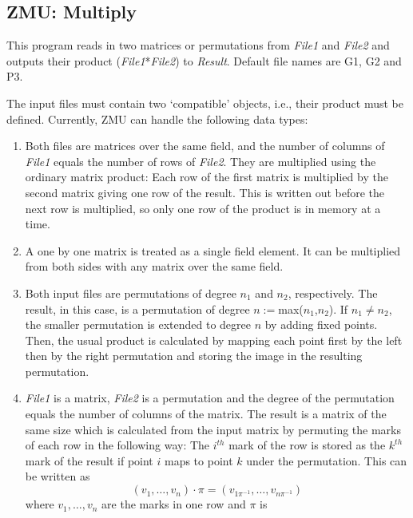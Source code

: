 \subsection{ZMU: Multiply}\label{sec:zmu}
\Syntax
{}

\Description
This program reads in two matrices or permutations from {\it File1} and
{\it File2} and outputs their product ({\it File1}*{\it File2}) to 
{\it Result}. Default file names are G1,  G2 and P3.

The input files must contain two `compatible' objects, i.e., their
product must be defined. Currently,  ZMU can handle the following
data types:
\begin{enumerate}
\item	Both files are matrices over the same field, and the
	number of columns of {\it File1} equals the number of rows of
        {\it File2}.
     	They are multiplied using the ordinary matrix product: Each
	row of the first matrix is multiplied by the second matrix
	giving one row of the result. This is written out before the
        next row is multiplied, so only one row of the product is in
        memory at a time.
\item	A one by one matrix is treated as a single field
	element. It can be multiplied from both sides with any
	matrix over the same field.
\item	Both input files are permutations of degree $n_1$ and $n_2$,
	respectively. The result, in this case, is a permutation of
	degree $n:=$max($n_1$,$n_2$). If $n_1\neq n_2$, the smaller
	permutation is extended to degree $n$ by adding fixed points.
	Then, the usual product is
	calculated by mapping each point first by the left then by
	the right permutation and storing the image in the resulting
	permutation.
\item	{\it File1} is a matrix, {\it File2} is a permutation and the
        degree of the permutation equals the number of columns of the
        matrix.
	The result is a matrix of the same size which is calculated
	from the input matrix by permuting the marks of each row in
	the following way: The $i^{th}$ mark of the row is stored as
	the $k^{th}$ mark of the result if point $i$ maps to point $k$
	under the permutation. This can be written as
	\[
		(v_1,\ldots,v_n)\cdot\pi =
		(v_{1\pi^{-1}},\ldots,v_{n\pi^{-1}})
	\]
	where $v_1,\ldots,v_n$ are the marks in one row and $\pi$ is

\end{enumerate}
